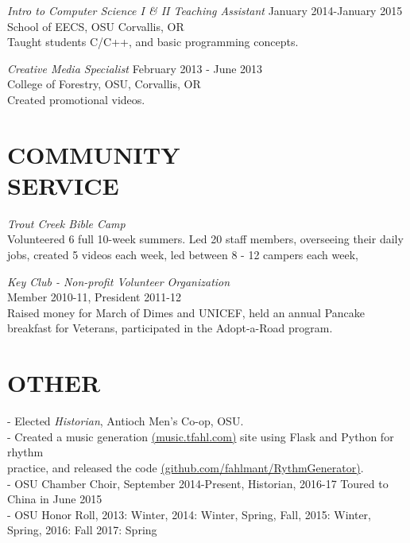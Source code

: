 \documentclass[line,margin]{res}
\begin{document}
\begin{resume}
                    {\sl Intro to Computer Science I \& II Teaching Assistant} \hfill January 2014-January 2015\\
                    School of EECS, OSU
                    Corvallis, OR\\
                    Taught students C/C++, and basic programming concepts.
                    
                    {\sl Creative Media Specialist} \hfill February 2013 - June 2013 \\
                    College of Forestry, OSU,
                    Corvallis, OR\\
                    Created promotional videos.
 
\section{COMMUNITY \\ SERVICE}  
                {\sl Trout Creek Bible Camp\\}
                    Volunteered 6 full 10-week summers.
                    Led 20 staff members, overseeing their daily jobs,
                    created 5 videos each week,
                    led between 8 - 12 campers each week,

                {\sl Key Club - Non-profit Volunteer Organization\\}
                    Member 2010-11, President 2011-12\\
                    Raised money for March of Dimes and UNICEF, held an annual Pancake breakfast
                    for Veterans, participated in the Adopt-a-Road program.

\section{OTHER\\}             
                - Elected {\it Historian}, Antioch Men's Co-op, OSU. \\
                - Created a music generation \href{http://music.tfahl.com}{(music.tfahl.com)} 
                      site using Flask and Python for rhythm\\ 
                      practice, and released the code 
                      \href{https://github.com/fahlmant/RhythmGenerator}{(github.com/fahlmant/RythmGenerator)}.\\
                - OSU Chamber Choir, September 2014-Present, Historian, 2016-17 Toured to China in June 2015\\
                - OSU Honor Roll, 2013: Winter, 2014: Winter, Spring, Fall, 2015: Winter, Spring, 2016: Fall 2017: Spring\\

\end{resume}
\end{document}
